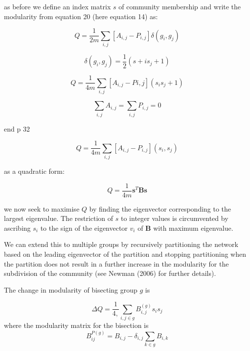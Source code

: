 as before we define an index matrix $s$ of community membership and write the modularity from equation 20 (here equation 14) as:

\begin{equation}
Q = \frac{1}{2m}\sum_{i,j}[A_{i,j}-P_{i,j}]\delta (g_i,g_j)	
\end{equation}

\begin{equation}
\delta(g_i,g_j)	= \frac{1}{2}(s+i s_j + 1)
\end{equation}

\begin{equation}
	Q = \frac{1}{4m}\sum_{i,j}[A_{i,j}-P{i,j}](s_i s_j + 1)
\end{equation}

\begin{equation}
\sum_{i,j} A_{i,j}=\sum_{i,j}P_{i,j}=0
\end{equation}

end p 32

\begin{equation}
Q = \frac{1}{4m}\sum_{i,j}[A_{i,j}-P_{i,j}](s_i,s_j)	
\end{equation}

as a quadratic form:

\begin{equation}
	Q = \frac{1}{4m}\mathbf{s}^T\mathbf{Bs}
\end{equation}

we now seek to maximise $Q$ by finding the eigenvector corresponding to the largest eigenvalue. The restriction of $s$ to integer values is circumvented by ascribing $s_i$ to the sign of the eigenvector $v_i$
of $\mathbf{B}$ with maximum eigenvalue.

We can extend this to multiple groups by recursively partitioning the network based on the leading eigenvector of the partition and stopping partitioning when the partition does not result in a further increase in the modularity for the subdivision of the community (see Newman (2006) for further details).

The change in modularity of bisecting group $g$ is 

\begin{equation}
    \Delta Q = \frac{1}{4,} \sum_{i,j \in g} B_{i,j}^{(g)}s_i s_j
\end{equation}
where the modularity matrix for the bisection is 
\begin{equation}
B_{ij}^{P(g)} = B_{i,j} - \delta_{i,j}\sum_{k \in g} B_{i,k}  
\end{equation}
\label{eq:Change in modularity spectral clustering}

